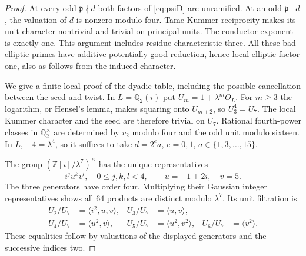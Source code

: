 \documentclass[11pt,a4paper]{article}
\numberwithin{equation}{section}
\theoremstyle{definition}
\theoremstyle{remark}
\newcommand{\Q}{\mathbb Q}
\newcommand{\Z}{\mathbb Z}
\begin{document}
\begin{proof}
At every odd $\mathfrak p\nmid d$ both factors of \eqref{eq:psiD} are unramified. At an odd $\mathfrak p\mid d$, the valuation of $d$ is nonzero modulo four. Tame Kummer reciprocity makes its unit character nontrivial and trivial on principal units. The conductor exponent is exactly one. This argument includes residue characteristic three. All these bad elliptic primes have additive potentially good reduction, hence local elliptic factor one, also as follows from the induced character.

We give a finite local proof of the dyadic table, including the possible cancellation between the seed and twist. In $L=\Q_2(i)$ put $U_m=1+\lambda^mO_L$. For $m\ge3$ the logarithm, or Hensel's lemma, makes squaring onto $U_{m+2}$, so $U_3^4=U_7$. The local Kummer character and the seed are therefore trivial on $U_7$. Rational fourth-power classes in $\Q_2^\times$ are determined by $v_2$ modulo four and the odd unit modulo sixteen. In $L$, $-4=\lambda^4$, so it suffices to take $d=2^ea$, $e=0,1$, $a\in\{1,3,\ldots,15\}$.

The group $(\Z[i]/\lambda^7)^\times$ has the unique representatives
\[
 i^j u^k v^l,\quad0\le j,k,l<4,\qquad u=-1+2i,\quad v=5.
\]
The three generators have order four. Multiplying their Gaussian integer representatives shows all $64$ products are distinct modulo $\lambda^7$. Its unit filtration is
\begin{align*}
 U_2/U_7&=\langle i^2,u,v\rangle,&
 U_3/U_7&=\langle u,v\rangle,\\
 U_4/U_7&=\langle u^2,v\rangle,&
 U_5/U_7&=\langle u^2,v^2\rangle,&
 U_6/U_7&=\langle v^2\rangle .
\end{align*}
These equalities follow by valuations of the displayed generators and the successive indices two.


\end{proof}
\end{document}
